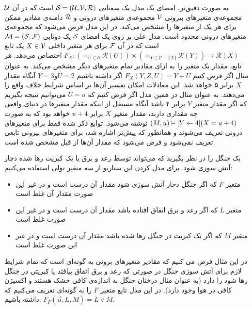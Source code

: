 به صورت دقیق‌تر، امضای یک مدل یک سه‌تایی
$\mathcal{S} = (\mathcal{U},\mathcal{V},\mathcal{R})$
است که در آن
$\mathcal{U}$
مجموعه‌ی متغیر‌های بیرونی
$\mathcal{V}$
مجموعه‌ی متغیر‌های درونی و
$\mathcal{R}$
دامنه‌ی مقادیر ممکن برای هر یک از متغیر‌ها را مشخص می‌کند.
در این مدل فرض می‌شود که مجموعه‌ی متغیر‌های درونی محدود است.
مدل علی بر روی یک امضای
$\mathcal{S}$
یک دوتایی
$\mathcal{M} = (\mathcal{S},\mathcal{F})$
است که در آن
$\mathcal{F}$
برای هر متغیر داخلی
$X \in \mathcal{V}$
یک تابع
$F_X: (\times_{U\in \mathcal{U}}\mathcal{R}(U))\times (\times_{Y\in\mathcal{V}-\{X\}}\mathcal{R}(Y))\rightarrow \mathcal{R}(X)$
اختصاص می‌دهد.
هر تابع، مقدار یک متغیر را به ازای مقادیر تمام متغیر‌های دیگر مشخص می‌کند.
به عنوان مثال اگر فرض کنیم
$F_X(Y,Z,U) = Y + U$
اگر داشته باشیم
$Y=3و U=2$
آنگاه مقدار
$X$
برابر ۵ خواهد شد.
این معادلات امکان تفسیر آن‌ها بر اساس شرایط خلاف واقع را می‌دهند.
به عنوان مثال در همین مدل اگر فرض کنیم که
$U=u$
می‌توانیم نتیجه بگیریم که اگر مقدار متغیر
$Y$
برابر ۴ باشد آنگاه مستقل از اینکه مقدار متغیر‌ها در دنیای واقعی چه مقداری دارند، مقدار متغیر
$X$
برابر
$u+4$
خواهد بود که به صورت
$(M,u) \vDash [Y \leftarrow 4](X = u + 4)$
نوشته می‌شود.
توابع ذکر شده فقط برای متغیر‌های درونی تعریف می‌شوند و همانطور که پیش‌تر اشاره شد، برای متغیرهای بیرونی تابعی تعریف نمی‌شود و فرض می‌شود که مقدار آن‌ها از قبل مشخص شده است.

\begin{example}
    \label{ex:fire}
    یک جنگل را در نظر بگیرید که می‌تواند توسط رعد و برق یا یک کبریت رها شده دچار آتش سوزی شود.
    برای مدل کردن این سناریو از سه متغیر بولی استفاده می‌کنیم:
    \begin{itemize}
        \item متغیر
              $F$
              که اگر جنگل دچار آتش سوزی شود مقدار آن درست است و در غیر این صورت مقدار آن غلط است
        \item متغیر
              $L$
              که اگر رعد و برق اتفاق افتاده باشد مقدار آن درست است و در غیر این صورت غلط است
        \item متغیر
              $M$
              که اگر یک کبریت در جنگل رها شده باشد مقدار آن درست است و در غیر این صورت غلط است
    \end{itemize}
\end{example}
در این مثال فرض می کنیم که مقادیر متغیر‌های برونی به گونه‌ای است که تمام شرایط لازم برای آتش سوزی جنگل در صورتی که رعد و برق اتفاق بیافتد یا کبریتی در جنگل رها شود را دارد
(به عنوان مثال درختان جنگل به اندازه‌ی کافی خشک هستند و اکسیژن کافی در هوا وجود دارد).
در این مدل تابع متغیر
$F$
را به گونه‌ای تعریف می‌کنیم که داشته باشیم:
$F_F(\vec u, L , M) = L \vee M$.

